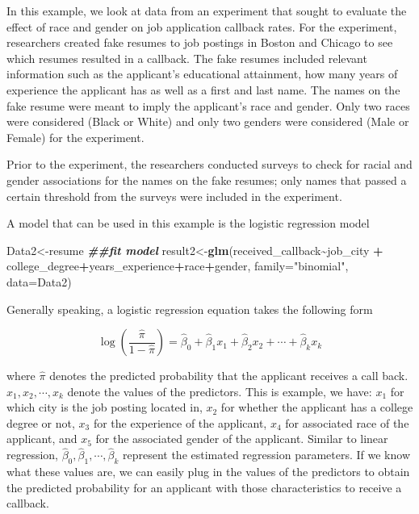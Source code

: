 \documentclass[
]{book}
\newenvironment{Shaded}{\begin{snugshade}}{\end{snugshade}}
\newcommand{\AttributeTok}[1]{\textcolor[rgb]{0.13,0.29,0.53}{#1}}
\newcommand{\DocumentationTok}[1]{\textcolor[rgb]{0.56,0.35,0.01}{\textbf{\textit{#1}}}}
\newcommand{\FunctionTok}[1]{\textcolor[rgb]{0.13,0.29,0.53}{\textbf{#1}}}
\newcommand{\NormalTok}[1]{#1}
\newcommand{\OtherTok}[1]{\textcolor[rgb]{0.56,0.35,0.01}{#1}}
\newcommand{\SpecialCharTok}[1]{\textcolor[rgb]{0.81,0.36,0.00}{\textbf{#1}}}
\newcommand{\StringTok}[1]{\textcolor[rgb]{0.31,0.60,0.02}{#1}}
\begin{document}
In this example, we look at data from an experiment that sought to evaluate the effect of race and gender on job application callback rates. For the experiment, researchers created fake resumes to job postings in Boston and Chicago to see which resumes resulted in a callback. The fake resumes included relevant information such as the applicant's educational attainment, how many years of experience the applicant has as well as a first and last name. The names on the fake resume were meant to imply the applicant's race and gender. Only two races were considered (Black or White) and only two genders were considered (Male or Female) for the experiment.

Prior to the experiment, the researchers conducted surveys to check for racial and gender associations for the names on the fake resumes; only names that passed a certain threshold from the surveys were included in the experiment.

A model that can be used in this example is the logistic regression model

\begin{Shaded}
\begin{Highlighting}[]
\NormalTok{Data2}\OtherTok{\textless{}{-}}\NormalTok{resume}
\DocumentationTok{\#\#fit model}
\NormalTok{result2}\OtherTok{\textless{}{-}}\FunctionTok{glm}\NormalTok{(received\_callback}\SpecialCharTok{\textasciitilde{}}\NormalTok{job\_city }\SpecialCharTok{+}\NormalTok{ college\_degree}\SpecialCharTok{+}\NormalTok{years\_experience}\SpecialCharTok{+}\NormalTok{race}\SpecialCharTok{+}\NormalTok{gender, }\AttributeTok{family=}\StringTok{"binomial"}\NormalTok{, }\AttributeTok{data=}\NormalTok{Data2)}
\end{Highlighting}
\end{Shaded}

Generally speaking, a logistic regression equation takes the following form

\[
\log (\frac{\hat{\pi}}{1-\hat{\pi}}) = \hat{\beta}_0 + \hat{\beta}_1 x_1 + \hat{\beta}_2 x_2 + \cdots + \hat{\beta}_k x_k
\]

where \(\hat{\pi}\) denotes the predicted probability that the applicant receives a call back. \(x_1, x_2, \cdots, x_k\) denote the values of the predictors. This is example, we have: \(x_1\) for which city is the job posting located in, \(x_2\) for whether the applicant has a college degree or not, \(x_3\) for the experience of the applicant, \(x_4\) for associated race of the applicant, and \(x_5\) for the associated gender of the applicant. Similar to linear regression, \(\hat{\beta}_0, \hat{\beta}_1, \cdots, \hat{\beta}_k\) represent the estimated regression parameters. If we know what these values are, we can easily plug in the values of the predictors to obtain the predicted probability for an applicant with those characteristics to receive a callback.
\end{document}
